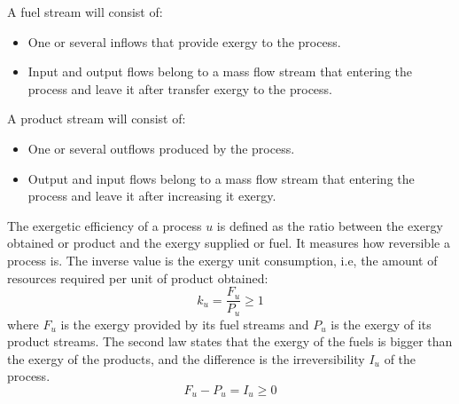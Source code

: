 \documentclass[preprint,12pt,times]{elsarticle}
\begin{document}
A fuel stream will consist of:
\begin{itemize}
	\item One or several inflows that provide exergy to the process.
	\item Input and output flows belong to a mass flow stream that entering the process and leave it after transfer exergy to the process.
\end{itemize}
A product stream will consist of:
\begin{itemize}
	\item One or several outflows produced by the process.
	\item Output and input flows belong to a mass flow stream that entering the process and leave it after increasing it exergy.
\end{itemize}

The exergetic efficiency of a process $u$ is defined as the ratio between the exergy obtained or product and the exergy supplied or fuel. It measures how reversible a process is. The inverse value is the exergy unit consumption, i.e, the amount of resources required per unit of product obtained:
\begin{equation}
k_u=\frac{F_u}{P_u} \ge 1
\end{equation}
where $F_u$ is the exergy provided by its fuel streams and $P_u$ is the exergy of its product streams. The second law states that the exergy of the fuels is bigger than the exergy of the products, and the difference is the irreversibility $I_u$ of the process.
\begin{equation}
\label{eq:fpi}
F_u - P_u = I_u \ge 0
\end{equation}
\end{document}
